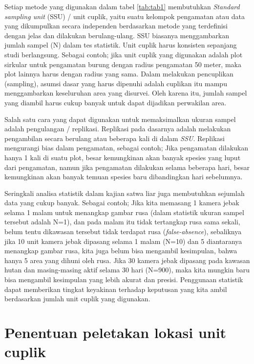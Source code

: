 \documentclass[
  oneside]{book}
\begin{document}
Setiap metode yang digunakan dalam tabel \ref{tab:tab1} membutuhkan \emph{Standard sampling unit} (SSU) / unit cuplik, yaitu suatu kelompok pengamatan atau data yang dikumpulkan secara independen berdasarkan metode yang terdefinisi dengan jelas dan dilakukan berulang-ulang. SSU biasanya menggambarkan jumlah sampel (N) dalam tes statistik. Unit cuplik harus konsisten sepanjang studi berlangsung. Sebagai contoh; jika unit cuplik yang digunakan adalah plot sirkular untuk pengamatan burung dengan radius pengamatan 50 meter, maka plot lainnya harus dengan radius yang sama. Dalam melakukan pencuplikan (sampling), asumsi dasar yang harus dipenuhi adalah cuplikan itu mampu menggambarkan keseluruhan area yang disurvei. Oleh karena itu, jumlah sampel yang diambil harus cukup banyak untuk dapat dijadikan perwakilan area.

Salah satu cara yang dapat digunakan untuk memaksimalkan ukuran sampel adalah pengulangan / replikasi. Replikasi pada dasarnya adalah melakukan pengambilan secara berulang atau beberapa kali di dalam \emph{SSU}. Replikasi mengurangi bias dalam pengamatan, sebagai contoh; Jika pengamatan dilakukan hanya 1 kali di suatu plot, besar kemungkinan akan banyak spesies yang luput dari pengamatan, namun jika pengamatan dilakukan selama beberapa hari, besar kemungkinan akan banyak temuan spesies baru dibandingkan hari sebelumnya.

Seringkali analisa statistik dalam kajian satwa liar juga membutuhkan sejumlah data yang cukup banyak. Sebagai contoh; Jika kita memasang 1 kamera jebak selama 1 malam untuk menangkap gambar rusa (dalam statistik ukuran sampel tersebut adalah N=1), dan pada malam itu tidak tertangkap rusa sama sekali, belum tentu dikawasan tersebut tidak terdapat rusa (\emph{false-absence}), sebaliknya jika 10 unit kamera jebak dipasang selama 1 malam (N=10) dan 5 diantaranya menangkap gambar rusa, kita juga belum bisa mengambil kesimpulan, bahwa hanya 5 area yang dihuni oleh rusa. Jika 30 kamera jebak dipasang pada kawasan hutan dan masing-masing aktif selama 30 hari (N=900), maka kita mungkin baru bisa mengambil kesimpulan yang lebih akurat dan presisi. Penggunaan statistik dapat memberikan tingkat keyakinan terhadap keputusan yang kita ambil berdasarkan jumlah unit cuplik yang digunakan.

\hypertarget{penentuan-peletakan-lokasi-unit-cuplik}{%
\section*{Penentuan peletakan lokasi unit cuplik}\label{penentuan-peletakan-lokasi-unit-cuplik}}
\end{document}
